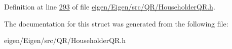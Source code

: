 Definition at line \hyperlink{eigen_2_eigen_2src_2_q_r_2_householder_q_r_8h_source_l00293}{293} of file \hyperlink{eigen_2_eigen_2src_2_q_r_2_householder_q_r_8h_source}{eigen/\+Eigen/src/\+Q\+R/\+Householder\+Q\+R.\+h}.



The documentation for this struct was generated from the following file\+:\begin{DoxyCompactItemize}
\item 
eigen/\+Eigen/src/\+Q\+R/\+Householder\+Q\+R.\+h\end{DoxyCompactItemize}
